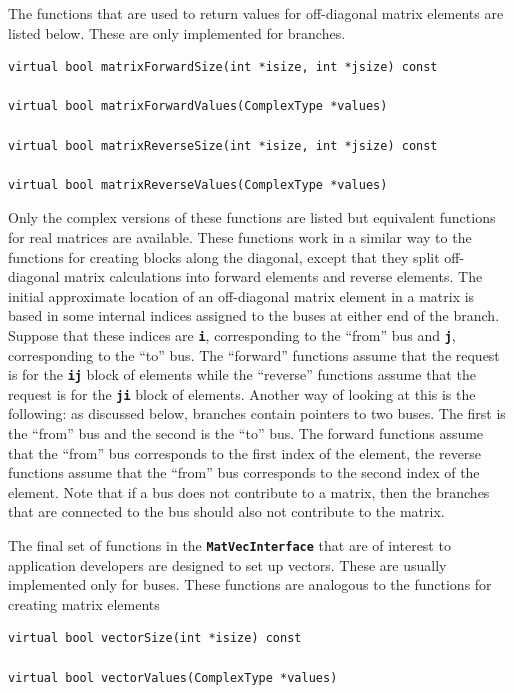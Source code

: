 The functions that are used to return values for off-diagonal matrix elements are listed below. These are only implemented for branches.

{
\color{red}
\begin{Verbatim}[fontseries=b]
virtual bool matrixForwardSize(int *isize, int *jsize) const

virtual bool matrixForwardValues(ComplexType *values)

virtual bool matrixReverseSize(int *isize, int *jsize) const

virtual bool matrixReverseValues(ComplexType *values)
\end{Verbatim}
}

Only the complex versions of these functions are listed but equivalent functions
for real matrices are available. These functions work in a similar way to the
functions for creating blocks along the diagonal, except that they split
off-diagonal matrix calculations into forward elements and reverse elements. The
initial approximate location of an off-diagonal matrix element in a matrix is
based in some internal indices assigned to the buses at either end of the
branch. Suppose that these indices are \texttt{\textbf{i}}, corresponding to the
``from'' bus and \texttt{\textbf{j}}, corresponding to the ``to'' bus. The
``forward'' functions assume that the request is for the \texttt{\textbf{ij}}
block of elements while the ``reverse'' functions assume that the request is for
the \texttt{\textbf{ji}} block of elements. Another way of looking at this is the following: as discussed below, branches contain pointers to two buses. The first is the ``from'' bus and the second is the ``to'' bus. The forward functions assume that the ``from'' bus corresponds to the first index of the element, the reverse functions assume that the ``from'' bus corresponds to the second index of the element. Note that if a bus does not contribute to a matrix, then the branches that are connected to the bus should also not contribute to the matrix.

The final set of functions in the \texttt{\textbf{MatVecInterface}} that are of interest to application developers are designed to set up vectors. These are usually implemented only for buses. These functions are analogous to the functions for creating matrix elements

{
\color{red}
\begin{Verbatim}[fontseries=b]
virtual bool vectorSize(int *isize) const

virtual bool vectorValues(ComplexType *values)
\end{Verbatim}
}

